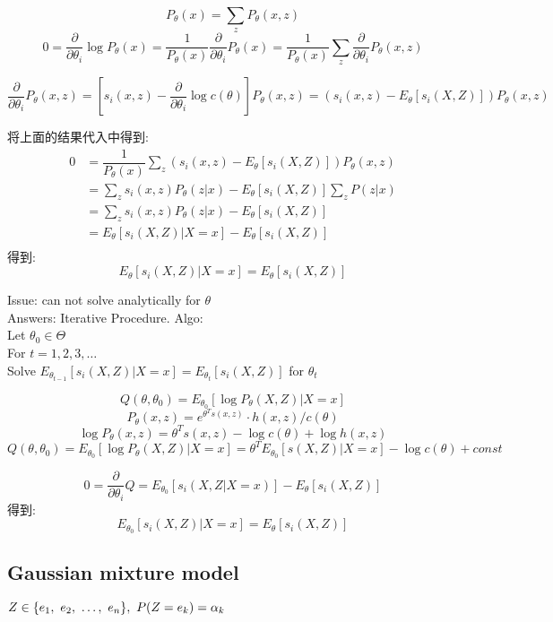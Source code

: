\documentclass{article}
\begin{document}
$$P_\theta(x) = \sum_z P_\theta(x,z)$$
$$
0 
= \dfrac{\partial}{\partial \theta_i} \log P_\theta(x) 
= \dfrac{1}{P_\theta(x)} \dfrac{\partial }{\partial \theta_i} P_\theta(x)
= \dfrac{1}{P_\theta(x)} \sum_z \dfrac{\partial }{\partial \theta_i} P_\theta(x,z)
$$

\begin{equation}
\dfrac{\partial }{\partial \theta_i} P_\theta(x,z)
= [s_i(x,z) - \dfrac{\partial }{\partial \theta_i} \log c(\theta)] P_\theta(x,z)
= (s_i(x,z) - E_\theta[s_i(X,Z)]) P_\theta(x,z)
\end{equation}

将上面的结果代入\lasteq 中得到:
$$
\begin{aligned}
0 
& = \dfrac{1}{P_\theta(x)} \sum_z (s_i(x,z) - E_\theta[s_i(X,Z)]) P_\theta(x,z) \\
& = \sum_z s_i(x,z)P_\theta(z|x) - E_\theta[s_i(X,Z)] \sum_z P(z|x) \\
& = \sum_z s_i(x,z)P_\theta(z|x) - E_\theta[s_i(X,Z)] \\
& = E_\theta[s_i(X,Z)|X=x] - E_\theta[s_i(X,Z)] \\
\end{aligned}
$$
得到:
$$ E_\theta[s_i(X,Z)|X=x] = E_\theta[s_i(X,Z)] $$

\noindent
Issue: can not solve analytically for $\theta$\\
Answers: Iterative Procedure.
Algo: \\
Let $\theta_0 \in \Theta$ \\
For $t = 1,2,3, \ldots$\\
\quad Solve $E_{\theta_{t-1}}[s_i(X,Z)|X=x] = E_{\theta_t}[s_i(X,Z)]$ for $\theta_t$

$$ Q(\theta, \theta_0) = E_{\theta_0}[\log P_\theta(X,Z)|X=x] $$
$$P_\theta(x,z) = e^{\theta^T s(x,z)} \cdot h(x,z) / c(\theta)$$
$$\log P_\theta(x,z) = \theta^T s(x,z) - \log c(\theta) + \log h(x,z)$$
$$ 
Q(\theta, \theta_0) 
= E_{\theta_0}[\log P_\theta(X,Z)|X=x] 
= \theta^T E_{\theta_0}[s(X,Z)|X=x] - \log c(\theta) + const
$$

$$ 0 = \dfrac{\partial }{\partial \theta_i} Q = E_{\theta_0}[s_i(X,Z|X=x)] - E_\theta[s_i(X,Z)] $$
得到:
$$ E_{\theta_0}[s_i(X,Z)|X=x] = E_\theta[s_i(X,Z)] $$

\subsection{Gaussian mixture model}
$Z \in \{e_1,~e_2,~\ldots,~e_n\},\ P(Z = e_k) = \alpha_k$
\end{document}

